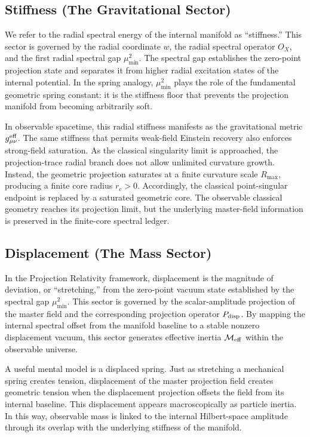 \documentclass[11pt]{article}
\begin{document}
\subsection{Stiffness (The Gravitational Sector)}

We refer to the radial spectral energy of the internal manifold as ``stiffness.'' This sector is governed by the radial coordinate \(w\), the radial spectral operator \(O_X\), and the first radial spectral gap \(\mu_{\min}^2\). The spectral gap establishes the zero-point projection state and separates it from higher radial excitation states of the internal potential. In the spring analogy, \(\mu_{\min}^2\) plays the role of the fundamental geometric spring constant: it is the stiffness floor that prevents the projection manifold from becoming arbitrarily soft.

In observable spacetime, this radial stiffness manifests as the gravitational metric \(g_{\mu\nu}^{\rm eff}\). The same stiffness that permits weak-field Einstein recovery also enforces strong-field saturation. As the classical singularity limit is approached, the projection-trace radial branch does not allow unlimited curvature growth. Instead, the geometric projection saturates at a finite curvature scale \(R_{\max}\), producing a finite core radius \(r_c>0\). Accordingly, the classical point-singular endpoint is replaced by a saturated geometric core. The observable classical geometry reaches its projection limit, but the underlying master-field information is preserved in the finite-core spectral ledger.

\subsection{Displacement (The Mass Sector)}

In the Projection Relativity framework, displacement is the magnitude of deviation, or ``stretching,'' from the zero-point vacuum state established by the spectral gap \(\mu_{\min}^2\). This sector is governed by the scalar-amplitude projection of the master field and the corresponding projection operator \(P_{\rm disp}\). By mapping the internal spectral offset from the manifold baseline to a stable nonzero displacement vacuum, this sector generates effective inertia \(\mathcal M_{\rm eff}\) within the observable universe.

A useful mental model is a displaced spring. Just as stretching a mechanical spring creates tension, displacement of the master projection field creates geometric tension when the displacement projection offsets the field from its internal baseline. This displacement appears macroscopically as particle inertia. In this way, observable mass is linked to the internal Hilbert-space amplitude through its overlap with the underlying stiffness of the manifold.
\end{document}
